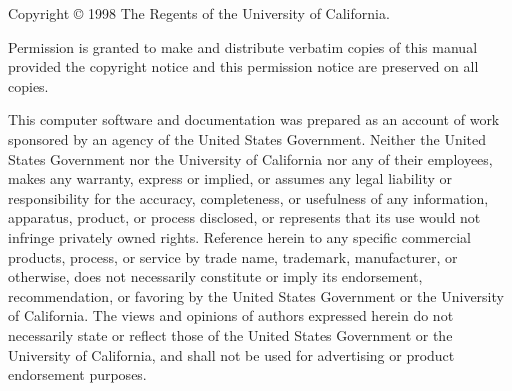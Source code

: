 \documentclass[11pt]{book}
\begin{document}

\begin{TitlePage}

\SubTitle{\today}
\vfill
\begin{center}
\end{center}
\vfill
{}

\end{TitlePage}


\begin{CopyrightPage}

\noindent
Copyright \copyright{} 1998 The Regents of the University of California.

\vspace{1em}\noindent
Permission is granted to make and distribute verbatim copies of this
manual provided the copyright notice and this permission notice are
preserved on all copies.

\vspace{1em}

This computer software and documentation was prepared as an account of
work sponsored by an agency of the United  States Government.  Neither
the United States Government nor the  University of California nor any
of their employees, makes any warranty, express or implied, or assumes
any legal liability  or responsibility for the accuracy, completeness,
or   usefulness of any   information,  apparatus, product, or  process
disclosed,   or represents that  its  use would not infringe privately
owned rights.  Reference  herein to any specific  commercial products,
process,   or service by   trade  name,  trademark,  manufacturer,  or
otherwise, does not  necessarily constitute or imply its  endorsement,
recommendation, or  favoring  by the  United  States Government or the
University of California.  The views and opinions of authors expressed
herein do not necessarily state or reflect those  of the United States
Government or the University of California, and shall  not be used for
advertising or product endorsement purposes.

\end{CopyrightPage}

\end{document}
